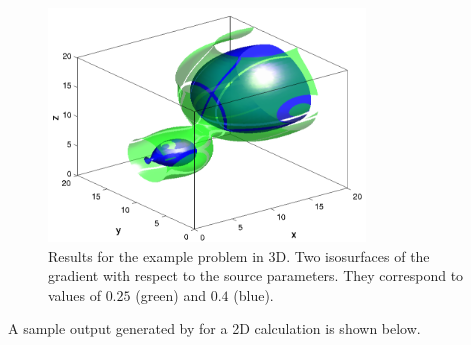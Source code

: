 \begin{figure}
  {\centerline{\includegraphics[width=0.75\textwidth]{cvsadjkryx_p3Dgrad}}}
  \caption{Results for the  example problem in 3D.
  Two isosurfaces of the gradient with respect to the source parameters. They correspond
  to values of $0.25$ (green) and $0.4$ (blue).}\label{f:cvsAtmDisp_ASAi_kry_bbd_p3D_b}  
\end{figure}
A sample output generated by  for a 2D calculation
is shown below.


